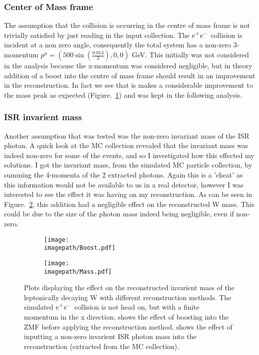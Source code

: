 \subsubsection{Center of Mass frame}
\label{SUBSUBSEC:CenterOfMassFrame}
The assumption that the collision is occurring in the centre of mass frame is not trivially satisfied by just reading in the input collection. The $e^{+}e^{-}$ collision is incident at a non zero angle, consequently the total system has a non-zero 3-momentum $ {p}^{\mu} = ( 500 \sin{(\frac{0.014}{2})}, 0, 0 )$ GeV. This initially was not considered in the analysis because the x-momentum was considered negligible, but in theory addition of a boost into the centre of mass frame should result in an improvement in the reconstruction. In fact we see that is makes a considerable improvement to the mass peak as expected (Figure.~\ref{SUBFIG:Boost}) and was kept in the following analysis.

\subsubsection{ISR invarient mass}
\label{SUBSUBSEC:ISRInvarientMass}
Another assumption that was tested was the non-zero invariant mass of the ISR photon. A quick look at the MC collection revealed that the invariant mass was indeed non-zero for some of the events, and so I investigated how this effected my solutions. I got the invariant mass, from the simulated MC particle collection, by summing the 4-momenta of the 2 extracted photons. Again this is a 'cheat' as this information would not be available to us in a real detector, however I was interested to see the effect it was having on my reconstruction. As can be seen in Figure.~\ref{SUBFIG:MassFig}, this addition had a negligible effect on the reconstructed W mass. This could be due to the size of the photon mass indeed being negligible, even if non-zero.

\begin{figure}
  \centering
  \begin{subfigure}[t]{0.45\textwidth}
    \centering
    \texttt{[image: \\imagepath/Boost.pdf]}
    \caption{}
    \label{SUBFIG:Boost}
  \end{subfigure}
  \begin{subfigure}[t]{0.45\textwidth}
    \centering
    \texttt{[image: \\imagepath/Mass.pdf]}
    \caption{}
    \label{SUBFIG:MassFig}
  \end{subfigure}
  \caption{
    Plots displaying the effect on the reconstructed invarient mass of the leptonically decaying W with different reconstruction methods.
    The simulated $e^{+}e^{-}$ collision is not head on, but with a finite momentum in the x direction,  shows the effect of boosting into the ZMF before applying the reconstruction method.
     shows the effect of inputting a non-zero invarient ISR photon mass into the reconstruction (extracted from the MC collection).
    }
  \label{FIG:BoostMass}
\end{figure}


